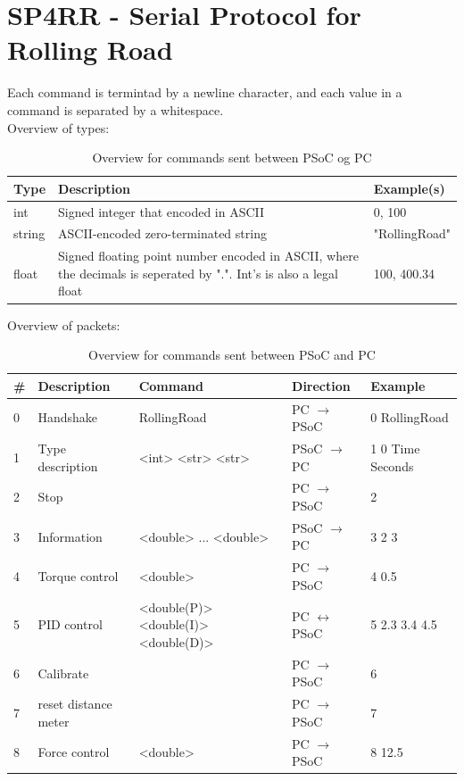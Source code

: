 \section{SP4RR - Serial Protocol for Rolling Road}
Each command is termintad by a newline character, and each value in a command is separated by a whitespace. \\

Overview of types:
\begin{table}[h!]
	\centering
	\label{Protocol:typeoverview}
	\begin{tabularx}{\linewidth}{p{1.5cm}Xp{3.5cm}}
		Type 	& Description 									& Example(s)    				\\\hline
		int  	& Signed integer that encoded in ASCII			& 0, 100 						\\
		string  & ASCII-encoded zero-terminated string 			& "RollingRoad"					\\ 
		float  	& Signed floating point number encoded in ASCII, where the decimals is seperated by ".". Int's is also a legal float      		& 100, 400.34 \\
	\end{tabularx}
	\caption{Overview for commands sent between PSoC og PC}
\end{table}

Overview of packets: 
\begin{table}[h!]
	\centering
	\label{Protocol:overviewRR}
	\begin{tabular}{l|llll}
		\# & Description 		& Command    		& Direction             & Example     		\\\hline
		0  & Handshake   		& RollingRoad 		& PC $\rightarrow$ PSoC & 0 RollingRoad 	\\
		1  & Type description 	& <int> <str> <str> & PSoC $\rightarrow$ PC & 1 0 Time Seconds 	\\
		2  & Stop        		&            		& PC $\rightarrow$ PSoC	& 2        			\\
		3  & Information 		& <double> ... <double>	& PSoC $\rightarrow$ PC & 3 2 3 	    	\\
		4  & Torque control 	& <double>    			& PC $\rightarrow$ PSoC & 4 0.5  				\\
		5  & PID control        & <double(P)> <double(I)> <double(D)> & PC $\leftrightarrow$ PSoC & 5 2.3 3.4 4.5 \\
		6  & Calibrate			&					& PC $\rightarrow$ PSoC & 6 \\ 
		7  & reset distance meter & 				& PC $\rightarrow$ PSoC & 7 \\ 
		8  & Force control		& <double>    			& PC $\rightarrow$ PSoC & 8 12.5  				\\
	\end{tabular}
	\caption{Overview for commands sent between PSoC and PC}
\end{table}

